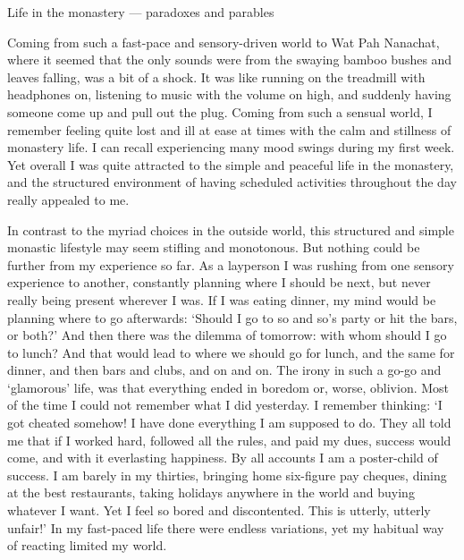 Life in the monastery --- paradoxes and parables

Coming from such a fast-pace and sensory-driven world to Wat Pah
Nanachat, where it seemed that the only sounds were from the swaying
bamboo bushes and leaves falling, was a bit of a shock. It was like
running on the treadmill with headphones on, listening to music with the
volume on high, and suddenly having someone come up and pull out the
plug. Coming from such a sensual world, I remember feeling quite lost
and ill at ease at times with the calm and stillness of monastery life.
I can recall experiencing many mood swings during my first week. Yet
overall I was quite attracted to the simple and peaceful life in the
monastery, and the structured environment of having scheduled activities
throughout the day really appealed to me.

In contrast to the myriad choices in the outside world, this structured
and simple monastic lifestyle may seem stifling and monotonous. But
nothing could be further from my experience so far. As a layperson I was
rushing from one sensory experience to another, constantly planning
where I should be next, but never really being present wherever I was.
If I was eating dinner, my mind would be planning where to go
afterwards: `Should I go to so and so's party or hit the bars, or both?'
And then there was the dilemma of tomorrow: with whom should I go to
lunch? And that would lead to where we should go for lunch, and the same
for dinner, and then bars and clubs, and on and on. The irony in such a
go-go and `glamorous' life, was that everything ended in boredom or,
worse, oblivion. Most of the time I could not remember what I did
yesterday. I remember thinking: `I got cheated somehow! I have done
everything I am supposed to do. They all told me that if I worked hard,
followed all the rules, and paid my dues, success would come, and with
it everlasting happiness. By all accounts I am a poster-child of
success. I am barely in my thirties, bringing home six-figure pay
cheques, dining at the best restaurants, taking holidays anywhere in the
world and buying whatever I want. Yet I feel so bored and discontented.
This is utterly, utterly unfair!' In my fast-paced life there were
endless variations, yet my habitual way of reacting limited my world.

